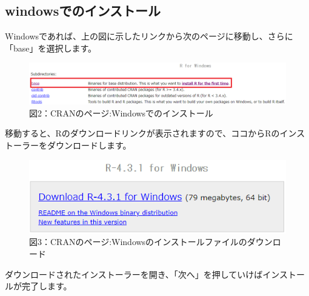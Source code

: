 \documentclass[
  letterpaper,
  DIV=11,
  numbers=noendperiod]{scrreprt}
\begin{document}
\hypertarget{windowsux3067ux306eux30a4ux30f3ux30b9ux30c8ux30fcux30eb}{%
\subsection{windowsでのインストール}\label{windowsux3067ux306eux30a4ux30f3ux30b9ux30c8ux30fcux30eb}}

Windowsであれば、上の図に示したリンクから次のページに移動し、さらに「base」を選択します。

\begin{figure}

{\centering \includegraphics{././image/CRAN_install2_win.png}

}

\caption{図2：CRANのページ:Windowsでのインストール}

\end{figure}

移動すると、Rのダウンロードリンクが表示されますので、ココからRのインストーラーをダウンロードします。

\begin{figure}

{\centering \includegraphics{././image/CRAN_install3_win.png}

}

\caption{図3：CRANのページ:Windowsのインストールファイルのダウンロード}

\end{figure}

ダウンロードされたインストーラーを開き、「次へ」を押していけばインストールが完了します。
\end{document}
